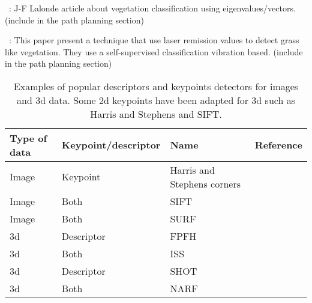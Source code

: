 ~\cite{Lalonde2006}:
J-F Lalonde article about vegetation classification using eigenvalues/vectors. (include in the path planning section)

~\cite{Wurm2009}:
This paper present a technique that use laser remission values to detect grass like vegetation. They use a self-supervised classification vibration based. (include in the path planning section)

\begin{table}[H]
    \centering
    \begin{tabular}{@{}llll@{}}
        \toprule
        \textbf{Type of data}  & \textbf{Keypoint/descriptor} & \textbf{Name}               & \textbf{Reference} \\
        \hline
        Image                  & Keypoint                     & Harris and Stephens corners & \cite{Harris1988}  \\
        Image                  & Both                         & SIFT                        & \cite{Lowe2004}    \\
        Image                  & Both                         & SURF                        & \cite{Bay2006}     \\
        \gls*{3d}              & Descriptor                   & FPFH                        & \cite{Rusu2009}    \\
        \gls*{3d}              & Both                         & ISS                         & \cite{Yu2009}      \\
        \gls*{3d}              & Descriptor                   & SHOT                        & \cite{Tombari2010} \\
        \gls*{3d}              & Both                         & NARF                        & \cite{Steder2011a} \\
        \bottomrule
    \end{tabular}
    \caption[Examples of popular descriptors and keypoints detectors for images and \gls*{3d} data.]{Examples of popular descriptors and keypoints detectors for images and \gls*{3d} data. Some \gls*{2d} keypoints have been adapted for \gls*{3d} such as Harris and Stephens and SIFT.}
    \label{tab:features_examples}
\end{table}
